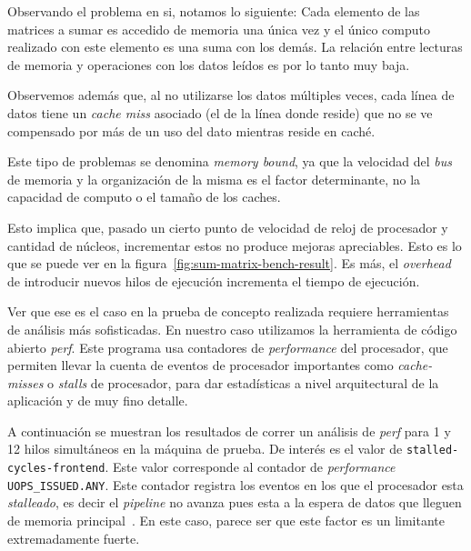 Observando el problema en si, notamos lo siguiente: Cada elemento de las
matrices a sumar es accedido de memoria una \'unica vez y el \'unico computo
realizado con este elemento es una suma con los dem\'as. La relaci\'on entre
lecturas de memoria y operaciones con los datos le\'idos es por lo tanto muy baja.

Observemos adem\'as que, al no utilizarse los datos m\'ultiples veces, cada l\'inea
de datos tiene un \textit{cache miss} asociado (el de la l\'inea donde reside) que
no se ve compensado por m\'as de un uso del dato mientras reside en cach\'e.

Este tipo de problemas se denomina \textit{memory bound}, ya que la velocidad del
\textit{bus} de memoria y la organizaci\'on de la misma es el factor determinante,
no la capacidad de computo o el tama\~no de los caches.

Esto implica que, pasado un cierto punto de velocidad de reloj de procesador y
cantidad de n\'ucleos, incrementar estos no produce mejoras apreciables. Esto es
lo que se puede ver en la figura~\ref{fig:sum-matrix-bench-result}. Es m\'as, el
\textit{overhead} de introducir nuevos hilos de ejecuci\'on incrementa el tiempo
de ejecuci\'on.

Ver que ese es el caso en la prueba de concepto realizada requiere herramientas
de an\'alisis m\'as sofisticadas. En nuestro caso utilizamos la herramienta de
c\'odigo abierto \textit{perf}. Este programa usa contadores de
\textit{performance} del procesador, que permiten llevar la cuenta de eventos de procesador
importantes como \textit{cache-misses} o \textit{stalls} de procesador, para dar estad\'isticas
a nivel arquitectural de la aplicaci\'on y de muy fino detalle.

A continuaci\'on se muestran los resultados de correr
un an\'alisis de \textit{perf} para 1 y 12 hilos simult\'aneos en la m\'aquina de
prueba. De inter\'es es el valor de \texttt{stalled-cycles-frontend}. Este valor
corresponde al contador de \textit{performance} \texttt{UOPS\_ISSUED.ANY}. Este
contador registra los eventos en los que el procesador esta \textit{stalleado},
es decir el \textit{pipeline } no avanza pues esta a la espera de datos que
lleguen de memoria principal~\cite{Intel3B}. En este
caso, parece ser que este factor es un limitante extremadamente fuerte.

